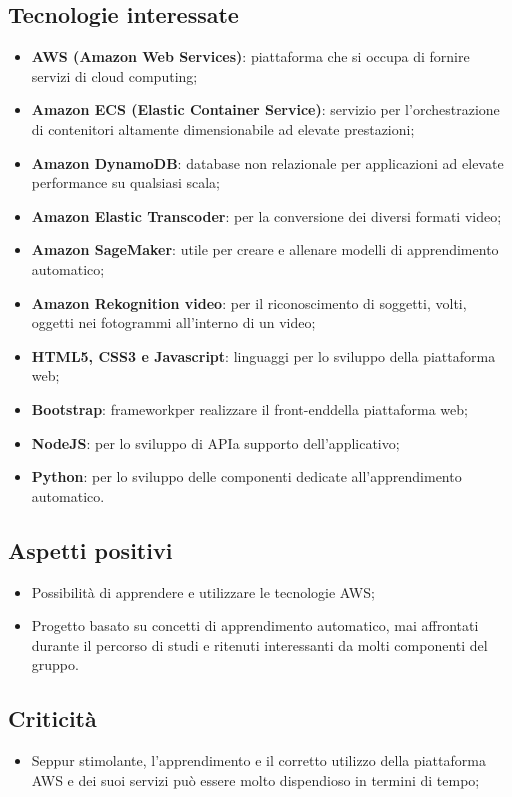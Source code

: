 \subsection{Tecnologie interessate}
\begin{itemize}
	\item \textbf{AWS (Amazon Web Services)}: piattaforma che si occupa di fornire servizi di cloud computing\glo;
	\item \textbf{Amazon ECS (Elastic Container Service)}: servizio per l'orchestrazione di contenitori altamente dimensionabile ad elevate	prestazioni;
	\item \textbf{Amazon DynamoDB}:  database non relazionale per applicazioni ad elevate performance su qualsiasi scala;
	\item \textbf{Amazon Elastic Transcoder}: per la conversione dei diversi formati video;
	\item \textbf{Amazon SageMaker}: utile per creare e allenare modelli di apprendimento automatico\glos;
	\item \textbf{Amazon Rekognition video}: per il riconoscimento di soggetti, volti, oggetti nei fotogrammi all'interno di un video;
	\item \textbf{HTML5, CSS3 e Javascript}: linguaggi per lo sviluppo della piattaforma web;
	\item \textbf{Bootstrap}: framework\glo per realizzare il front-end\glo della piattaforma web;
	\item \textbf{NodeJS}: per lo sviluppo di API\glo a supporto dell'applicativo;
	\item \textbf{Python}: per lo sviluppo delle componenti dedicate all'apprendimento automatico\glos.
\end{itemize}

\subsection{Aspetti positivi}
\begin{itemize}
	\item Possibilità di apprendere e utilizzare le tecnologie AWS;
	\item Progetto basato su concetti di apprendimento automatico\glos, mai affrontati durante il percorso di studi e ritenuti interessanti da molti componenti del gruppo.
\end{itemize}

\subsection{Criticità}
\begin{itemize}
	\item Seppur stimolante, l'apprendimento e il corretto utilizzo della piattaforma AWS e dei suoi servizi può essere molto dispendioso in termini di tempo;
	
\end{itemize}

